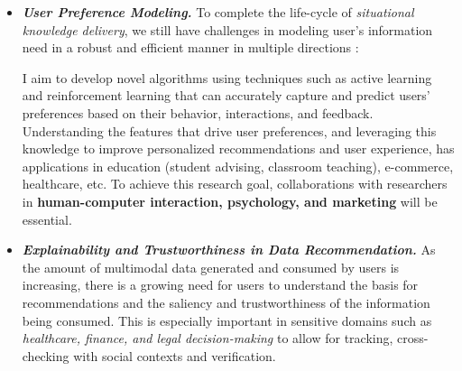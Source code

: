 \begin{itemize}[leftmargin=0pt, topsep=0pt,itemsep=0em]
    \item \textbf{\textit{User Preference Modeling.}}
To complete the life-cycle of \textit{situational knowledge delivery}, we still have challenges in modeling user's information need in a robust and efficient manner in multiple directions \cite{solaiman2021applying}:
I aim to develop novel algorithms using techniques such as active learning and reinforcement learning that can accurately capture and predict users' preferences based on their behavior, interactions, and feedback.
Understanding the features that drive user preferences, and leveraging this knowledge to improve personalized recommendations and user experience, has applications in education (student advising, classroom teaching), e-commerce, healthcare, etc.
%
%
To achieve this research goal, collaborations with researchers in \textbf{ human-computer interaction, psychology, and marketing} will be essential. 
\item \textbf{\textit{Explainability and Trustworthiness in Data Recommendation.}}
As the amount of multimodal data generated and consumed by users is increasing, there is a growing need for users to understand the basis for recommendations \cite{solaiman2022femmir}
and the saliency and trustworthiness of the information being consumed. This is especially important in sensitive domains such as \textit{healthcare, finance, and legal decision-making} to allow for tracking, cross-checking with social contexts and verification.

\end{itemize}
